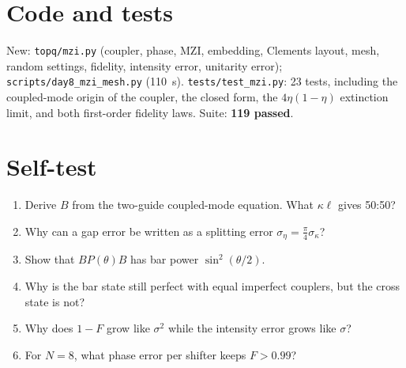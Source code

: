 \documentclass[10pt,a4paper]{article}
\begin{document}
\section{Code and tests}
New: \texttt{topq/mzi.py} (coupler, phase, MZI, embedding, Clements layout, mesh, random settings, fidelity, intensity error, unitarity error); \texttt{scripts/day8\_mzi\_mesh.py} (110~s). \texttt{tests/test\_mzi.py}: 23 tests, including the coupled-mode origin of the coupler, the closed form, the $4\eta(1-\eta)$ extinction limit, and both first-order fidelity laws. Suite: \textbf{119 passed}.

\section{Self-test}
\begin{enumerate}[itemsep=1pt]
\item Derive $B$ from the two-guide coupled-mode equation. What $\kappa\ell$ gives 50:50?
\item Why can a gap error be written as a splitting error $\sigma_\eta=\frac\pi4\sigma_\kappa$?
\item Show that $B P(\theta) B$ has bar power $\sin^2(\theta/2)$.
\item Why is the bar state still perfect with equal imperfect couplers, but the cross state is not?
\item Why does $1-F$ grow like $\sigma^2$ while the intensity error grows like $\sigma$?
\item For $N=8$, what phase error per shifter keeps $F>0.99$?
\end{enumerate}
\end{document}
